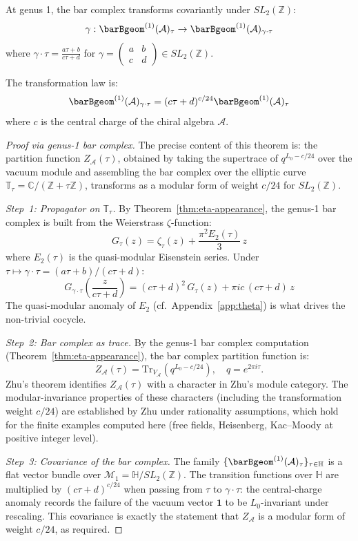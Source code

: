 \begin{theorem}\label{thm:modular-invariance}
At genus 1, the bar complex transforms covariantly under $SL_2(\mathbb{Z})$:
\[\gamma: \barBgeom^{(1)}(\mathcal{A})_\tau \to \barBgeom^{(1)}(\mathcal{A})_{\gamma \cdot \tau}\]
where $\gamma \cdot \tau = \frac{a\tau + b}{c\tau + d}$ for $\gamma = \begin{pmatrix} a & b \\ c & d \end{pmatrix} \in SL_2(\mathbb{Z})$.

The transformation law is:
\[\barBgeom^{(1)}(\mathcal{A})_{\gamma \cdot \tau} = (c\tau + d)^{c/24} \barBgeom^{(1)}(\mathcal{A})_\tau\]
where $c$ is the central charge of the chiral algebra $\mathcal{A}$.
\end{theorem}

\begin{proof}[Proof via genus-1 bar complex]
The precise content of this theorem is: the partition function $Z_\mathcal{A}(\tau)$, obtained by taking the supertrace of $q^{L_0 - c/24}$ over the vacuum module and assembling the bar complex over the elliptic curve $\mathbb{T}_\tau = \mathbb{C}/(\mathbb{Z} + \tau\mathbb{Z})$, transforms as a modular form of weight $c/24$ for $SL_2(\mathbb{Z})$.

\emph{Step~1: Propagator on $\mathbb{T}_\tau$.}
By Theorem~\ref{thm:eta-appearance}, the genus-1 bar complex is built from the Weierstrass $\zeta$-function:
\[
G_\tau(z) = \zeta_\tau(z) + \frac{\pi^2 E_2(\tau)}{3}\,z
\]
where $E_2(\tau)$ is the quasi-modular Eisenstein series.  Under $\tau \mapsto \gamma\cdot\tau = (a\tau+b)/(c\tau+d)$:
\[
G_{\gamma\cdot\tau}\!\left(\frac{z}{c\tau+d}\right) = (c\tau+d)^2\,G_\tau(z) + \pi i c\,(c\tau+d)\,z
\]
The quasi-modular anomaly of $E_2$ (cf.\ Appendix~\ref{app:theta}) is what drives the non-trivial cocycle.

\emph{Step~2: Bar complex as trace.}
By the genus-1 bar complex computation (Theorem~\ref{thm:eta-appearance}), the bar complex partition function is:
\[
Z_\mathcal{A}(\tau) = \mathrm{Tr}_{V_\mathcal{A}}\!\left(q^{L_0 - c/24}\right), \quad q = e^{2\pi i \tau}.
\]
Zhu's theorem \cite{Zhu96} identifies $Z_\mathcal{A}(\tau)$ with a character in Zhu's module category.  The modular-invariance properties of these characters (including the transformation weight $c/24$) are established by Zhu \cite[Thm.~4.4.2]{Zhu96} under rationality assumptions, which hold for the finite examples computed here (free fields, Heisenberg, Kac--Moody at positive integer level).

\emph{Step~3: Covariance of the bar complex.}
The family $\{\barBgeom^{(1)}(\mathcal{A})_\tau\}_{\tau \in \mathbb{H}}$ is a flat vector bundle over $\mathcal{M}_1 = \mathbb{H}/SL_2(\mathbb{Z})$.  The transition functions over $\mathbb{H}$ are multiplied by $(c\tau+d)^{c/24}$ when passing from $\tau$ to $\gamma\cdot\tau$: the central-charge anomaly records the failure of the vacuum vector $\mathbf{1}$ to be $L_0$-invariant under rescaling.  This covariance is exactly the statement that $Z_\mathcal{A}$ is a modular form of weight $c/24$, as required.
\end{proof}


